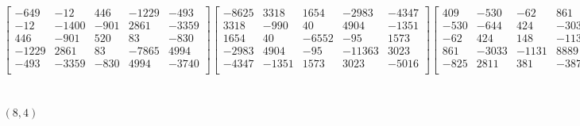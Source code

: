 \documentclass[12pt]{amsart}
\theoremstyle{plain}
\theoremstyle{definition}
\begin{document}
\begin{landscape}
\begin{align*}
\begin{bmatrix}
-649  &   -12  &   446  &   -1229  &   -493  \\ 
 -12  &   -1400  &   -901  &   2861  &   -3359  \\ 
 446  &   -901  &   520  &   83  &   -830  \\ 
 -1229  &   2861  &   83  &   -7865  &   4994  \\ 
 -493  &   -3359  &   -830  &   4994  &   -3740  \\ 
\end{bmatrix}
\begin{bmatrix}
-8625  &   3318  &   1654  &   -2983  &   -4347  \\ 
 3318  &   -990  &   40  &   4904  &   -1351  \\ 
 1654  &   40  &   -6552  &   -95  &   1573  \\ 
 -2983  &   4904  &   -95  &   -11363  &   3023  \\ 
 -4347  &   -1351  &   1573  &   3023  &   -5016  \\ 
\end{bmatrix}
\begin{bmatrix}
409  &   -530  &   -62  &   861  &   -825  \\ 
 -530  &   -644  &   424  &   -3033  &   2811  \\ 
 -62  &   424  &   148  &   -1131  &   381  \\ 
 861  &   -3033  &   -1131  &   8889  &   -3870  \\ 
 -825  &   2811  &   381  &   -3870  &   1575  \\ 
\end{bmatrix}
\\
(8,4) &:
\begin{bmatrix}
1333  &   1964  &   -2304  &   587  &   -3145  \\ 
 1964  &   697  &   183  &   500  &   -1822  \\ 
 -2304  &   183  &   -1159  &   1120  &   1126  \\ 
 587  &   500  &   1120  &   4565  &   1205  \\ 
 -3145  &   -1822  &   1126  &   1205  &   3273  \\ 
\end{bmatrix}
\begin{bmatrix}
2001  &   212  &   -1246  &   -1825  &   -2831  \\ 
 212  &   -581  &   141  &   1958  &   -1968  \\ 
 -1246  &   141  &   -804  &   -2569  &   2508  \\ 

\end{bmatrix}
\end{align*}
\end{landscape}
\end{document}
